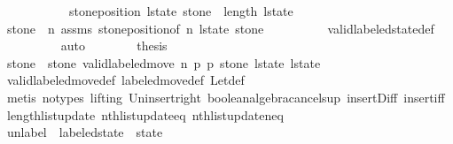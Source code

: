 \begin{isabellebody}
\ \ \ \ \ \ \ \ \ \ \ {\isachardoublequoteopen}stone{\isacharunderscore}position\ l{\isacharunderscore}state\ stone{\isacharprime}\ {\isacharless}\ length\ l{\isacharunderscore}state{\isachardoublequoteclose}\isanewline
\ \ \ \ \ \ \ \ \isamarkupfalse%
\ {\isacartoucheopen}stone{\isacharprime}\ {\isacharless}\ n{\isacartoucheclose}\ assms{\isacharparenleft}{}{\isacharminus}{}{\isacharparenright}\ stone{\isacharunderscore}position{\isacharbrackleft}of\ n\ l{\isacharunderscore}state\ stone{\isacharprime}{\isacharbrackright}\isanewline
\ \ \ \ \ \ \ \ \isamarkupfalse%
\ valid{\isacharunderscore}labeled{\isacharunderscore}state{\isacharunderscore}def\isanewline
\ \ \ \ \ \ \ \ \isamarkupfalse%
\ auto\isanewline
\ \ \ \ \ \ \isamarkupfalse%
\ {\isacharquery}thesis\isanewline
\ \ \ \ \ \ \ \ \isamarkupfalse%
\ {\isacharbackquoteopen}stone{\isacharprime}\ {\isasymnoteq}\ stone{\isacharbackquoteclose}\ {\isacharbackquoteopen}valid{\isacharunderscore}labeled{\isacharunderscore}move{\isacharprime}\ n\ p{}\ p{}\ stone\ l{\isacharunderscore}state\ l{\isacharunderscore}state{\isacharprime}{\isacharbackquoteclose}\isanewline
\ \ \ \ \ \ \ \ \isamarkupfalse%
\ valid{\isacharunderscore}labeled{\isacharunderscore}move{\isacharprime}{\isacharunderscore}def\ labeled{\isacharunderscore}move{\isacharunderscore}def\ Let{\isacharunderscore}def\isanewline
\ \ \ \ \ \ \ \ \isamarkupfalse%
\ {\isacharparenleft}metis\ {\isacharparenleft}no{\isacharunderscore}types{\isacharcomma}\ lifting{\isacharparenright}\ Un{\isacharunderscore}insert{\isacharunderscore}right\ boolean{\isacharunderscore}algebra{\isacharunderscore}cancel{\isachardot}sup{}\ insert{\isacharunderscore}Diff\ insert{\isacharunderscore}iff\ length{\isacharunderscore}list{\isacharunderscore}update\ nth{\isacharunderscore}list{\isacharunderscore}update{\isacharunderscore}eq\ nth{\isacharunderscore}list{\isacharunderscore}update{\isacharunderscore}neq{\isacharparenright}\isanewline
\ \ \ \ \isamarkupfalse%
\isanewline
\ \ \isamarkupfalse%
\isanewline
{}\isamarkupfalse%
%
\endisatagproof
{\isafoldproof}%
%
\isadelimproof
%
\endisadelimproof
%
\isadelimdocument
%
\endisadelimdocument
%
\isatagdocument
%
\isamarkuptrue%
%
\endisatagdocument
{\isafolddocument}%
%
\isadelimdocument
%
\endisadelimdocument
{}\isamarkupfalse%
\ unlabel\ {\isacharcolon}{\isacharcolon}\ {\isachardoublequoteopen}labeled{\isacharunderscore}state\ {\isasymRightarrow}\ state{\isachardoublequoteclose}\ \ \isanewline

\end{isabellebody}
